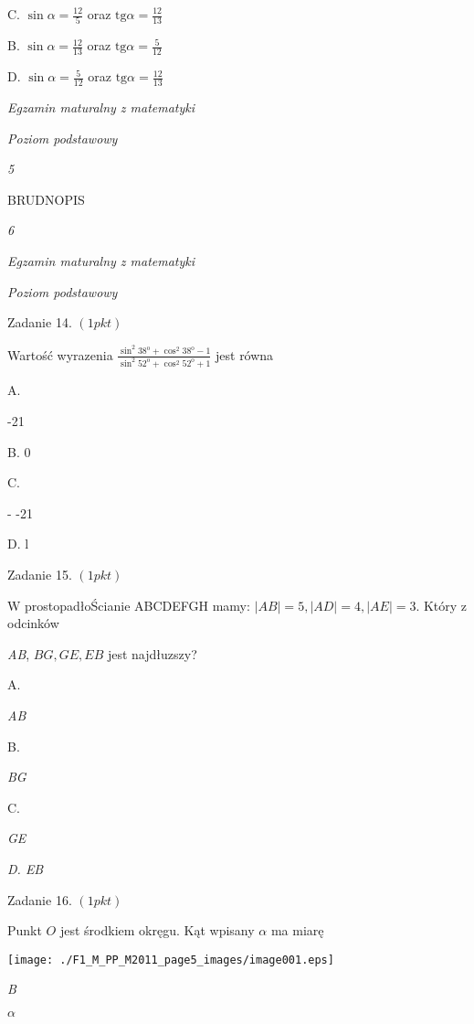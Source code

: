 \documentclass[a4paper,12pt]{article}
\begin{document}
C. $\displaystyle \sin\alpha=\frac{12}{5}$ oraz $\displaystyle \mathrm{t}\mathrm{g}\alpha=\frac{12}{13}$

B. $\displaystyle \sin\alpha=\frac{12}{13}$ oraz $\displaystyle \mathrm{t}\mathrm{g}\alpha=\frac{5}{12}$

D. $\displaystyle \sin\alpha=\frac{5}{12}$ oraz $\displaystyle \mathrm{t}\mathrm{g}\alpha=\frac{12}{13}$





{\it Egzamin maturalny z matematyki}

{\it Poziom podstawowy}

{\it 5}

BRUDNOPIS





{\it 6}

{\it Egzamin maturalny z matematyki}

{\it Poziom podstawowy}

Zadanie 14. $(1pkt)$

Wartość wyrazenia $\displaystyle \frac{\sin^{2}38^{\mathrm{o}}+\cos^{2}38^{\mathrm{o}}-1}{\sin^{2}52^{\mathrm{o}}+\cos^{2}52^{\mathrm{o}}+1}$ jest równa

A.

-21

B. 0

C.

- -21

D. l

Zadanie 15. $(1pkt)$

$\mathrm{W}$ prostopadłoŚcianie ABCDEFGH mamy: $|AB|=5, |AD|=4, |AE|=3$. Który z odcinków

{\it AB}, $BG, GE, EB$ jest najdłuzszy?

A.

{\it AB}

B.

{\it BG}

C.

{\it GE}

{\it D. EB}

Zadanie 16. $(1pkt)$

Punkt $O$ jest środkiem okręgu. Kąt wpisany $\alpha$ ma miarę
\begin{center}
\texttt{[image: ./F1\_M\_PP\_M2011\_page5\_images/image001.eps]}
\end{center}
{\it B}

$\alpha$
\end{document}
